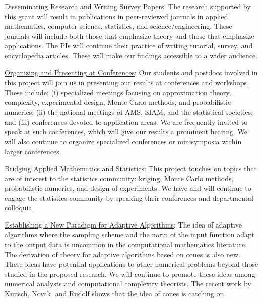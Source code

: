 \documentclass[11pt]{NSFamsart}
\newcommand{\Upara}[1]{\noindent\underline{\upshape #1}:}
\begin{document}
\Upara{Disseminating Research and Writing Survey Papers}
The research supported by this grant will result in publications in peer-reviewed journals in applied mathematics, computer science, statistics, and science/engineering. These 
journals will include both those that emphasize theory and those that emphasize applications. The PIs will continue their practice of writing tutorial, survey, and encyclopedia articles. These will make our findings accessible to a wider audience.


\Upara{Organizing and Presenting at Conferences}
Our students and postdocs involved in this project will join us in presenting our results at conferences and workshops. These include: (i) specialized meetings focusing on approximation theory, complexity, 
experimental design, Monte Carlo methods, and probabilistic numerics; (ii) the national meetings of AMS, SIAM, and the statistical societies; and (iii) conferences devoted to application areas. We are frequently invited to speak at such conferences, which will give our results a prominent hearing. We will also continue to organize specialized conferences or minisymposia within larger conferences.

\Upara{Bridging Applied Mathematics and Statistics}
This project touches on topics that are of interest to the statistics community: kriging, Monte Carlo methods, probabilistic numerics, and design of experiments. We have and will continue to engage the statistics community 
by speaking their conferences and departmental colloquia.

\Upara{Establishing a New Paradigm for Adaptive Algorithms} 
The idea of adaptive algorithms where the sampling scheme and the norm of the input function adapt to the output data is uncommon in the computational mathematics literature. The derivation of theory for adaptive algorithms based on cones is also new. These ideas have potential applications to other numerical problems beyond those studied in the proposed research. We will continue to promote these ideas among numerical analysts and computational complexity theorists. The recent work by Kunsch, Novak, and Rudolf \cite{KunEtal19a} shows that the idea of cones is catching on.
\end{document}
